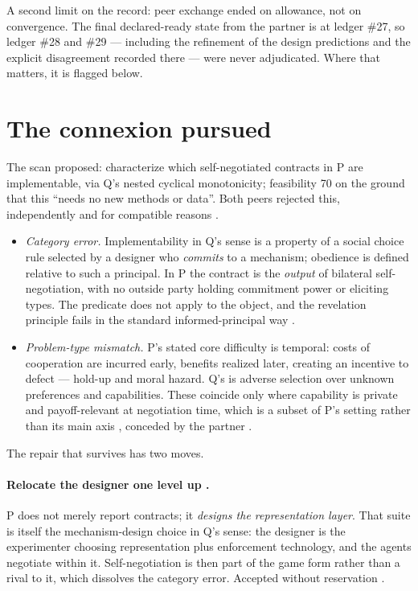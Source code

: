 \documentclass{article}
\begin{document}
A second limit on the record: peer exchange ended on allowance, not on convergence. The final declared-ready state from the partner is at ledger \#27, so ledger \#28 and \#29 --- including the refinement of the design predictions and the explicit disagreement recorded there --- were never adjudicated. Where that matters, it is flagged below.

\section{The connexion pursued}

The scan proposed: characterize which self-negotiated contracts in P are implementable, via Q's nested cyclical monotonicity; feasibility 70 on the ground that this ``needs no new methods or data''. Both peers rejected this, independently and for compatible reasons .

\begin{itemize}
\item \emph{Category error.} Implementability in Q's sense is a property of a social choice rule selected by a designer who \emph{commits} to a mechanism; obedience is defined relative to such a principal. In P the contract is the \emph{output} of bilateral self-negotiation, with no outside party holding commitment power or eliciting types. The predicate does not apply to the object, and the revelation principle fails in the standard informed-principal way .
\item \emph{Problem-type mismatch.} P's stated core difficulty is temporal: costs of cooperation are incurred early, benefits realized later, creating an incentive to defect --- hold-up and moral hazard. Q's is adverse selection over unknown preferences and capabilities. These coincide only where capability is private and payoff-relevant at negotiation time, which is a subset of P's setting rather than its main axis , conceded by the partner .
\end{itemize}

The repair that survives has two moves.

\paragraph{Relocate the designer one level up .} P does not merely report contracts; it \emph{designs the representation layer}. That suite is itself the mechanism-design choice in Q's sense: the designer is the experimenter choosing representation plus enforcement technology, and the agents negotiate within it. Self-negotiation is then part of the game form rather than a rival to it, which dissolves the category error. Accepted without reservation .
\end{document}

